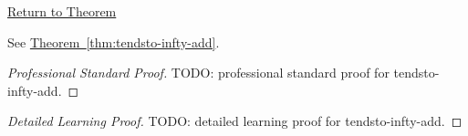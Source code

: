 \newpage
{}
\label{prf:tendsto-infty-add}

\begin{remark*}[Return]
\hyperref[thm:tendsto-infty-add]{Return to Theorem}
\end{remark*}

\begin{theorem*}
See \hyperref[thm:tendsto-infty-add]{Theorem~\ref*{thm:tendsto-infty-add}}.
\end{theorem*}

\begin{proof}[Professional Standard Proof]
\LRAProofBodyStart
TODO: professional standard proof for tendsto-infty-add.
\end{proof}

\begin{proof}[Detailed Learning Proof]
\LRAProofBodyStart
TODO: detailed learning proof for tendsto-infty-add.
\end{proof}

\begin{remark*}
\end{remark*}

\begin{dependencies}
\NoLocalDependencies
\end{dependencies}

\clearpage

